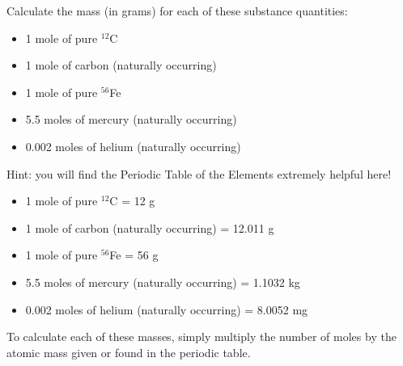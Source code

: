 

Calculate the mass (in grams) for each of these substance quantities:

\begin{itemize}
\item{} 1 mole of pure $^{12}$C
\vskip 5pt
\item{} 1 mole of carbon (naturally occurring)
\vskip 5pt
\item{} 1 mole of pure $^{56}$Fe
\vskip 5pt
\item{} 5.5 moles of mercury (naturally occurring)
\vskip 5pt
\item{} 0.002 moles of helium (naturally occurring)
\end{itemize} 

Hint: you will find the Periodic Table of the Elements extremely helpful here!







\begin{itemize} 
\item{} 1 mole of pure $^{12}$C = 12 g
\vskip 5pt
\item{} 1 mole of carbon (naturally occurring) = 12.011 g
\vskip 5pt
\item{} 1 mole of pure $^{56}$Fe = 56 g
\vskip 5pt
\item{} 5.5 moles of mercury (naturally occurring) = 1.1032 kg
\vskip 5pt
\item{} 0.002 moles of helium (naturally occurring) = 8.0052 mg
\end{itemize} 

\vskip 10pt

To calculate each of these masses, simply multiply the number of moles by the atomic mass given or found in the periodic table.











